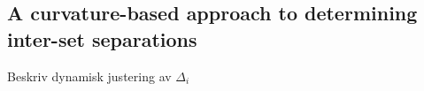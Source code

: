 \subsection{A curvature-based approach to determining inter-set separations}
\label{sub:a_curvature_based_approach_to_determining_inter_set_separations}


\begin{framed}
    Beskriv dynamisk justering av $\Delta_{i}$
\end{framed}

